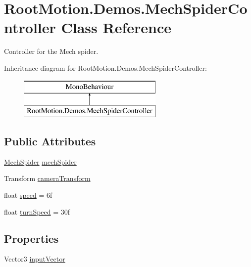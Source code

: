 \hypertarget{class_root_motion_1_1_demos_1_1_mech_spider_controller}{}\section{Root\+Motion.\+Demos.\+Mech\+Spider\+Controller Class Reference}
\label{class_root_motion_1_1_demos_1_1_mech_spider_controller}


Controller for the Mech spider.  


Inheritance diagram for Root\+Motion.\+Demos.\+Mech\+Spider\+Controller\+:\begin{figure}[H]
\begin{center}
\leavevmode
\includegraphics[height=2.000000cm]{class_root_motion_1_1_demos_1_1_mech_spider_controller}
\end{center}
\end{figure}
\subsection*{Public Attributes}
\begin{DoxyCompactItemize}
\item 
\mbox{\hyperlink{class_root_motion_1_1_demos_1_1_mech_spider}{Mech\+Spider}} \mbox{\hyperlink{class_root_motion_1_1_demos_1_1_mech_spider_controller_a19cebaa7378eab3837565d7c3bfb7e56}{mech\+Spider}}
\item 
Transform \mbox{\hyperlink{class_root_motion_1_1_demos_1_1_mech_spider_controller_a33344a3fe43034ef722dfdb418ed29c9}{camera\+Transform}}
\item 
float \mbox{\hyperlink{class_root_motion_1_1_demos_1_1_mech_spider_controller_a29bfa5445eb0a528e2549bf7bd4ae990}{speed}} = 6f
\item 
float \mbox{\hyperlink{class_root_motion_1_1_demos_1_1_mech_spider_controller_af0f37fe665ff1999b52ba6686685ed2a}{turn\+Speed}} = 30f
\end{DoxyCompactItemize}
\subsection*{Properties}
\begin{DoxyCompactItemize}
\item 
Vector3 \mbox{\hyperlink{class_root_motion_1_1_demos_1_1_mech_spider_controller_a45de00237db9277185b48df15a6c3639}{input\+Vector}}
\end{DoxyCompactItemize}


